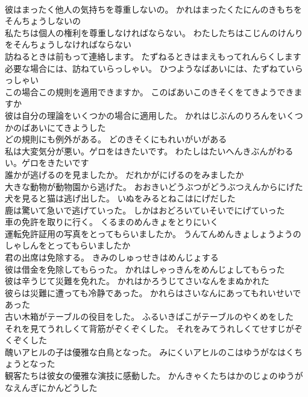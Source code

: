 \documentclass[8pt]{extreport}
\begin{document}
\begin{CJK}{UTF8}{min}
\\	彼はまったく他人の気持ちを尊重しないの。	かれはまったくたにんのきもちをそんちょうしないの 
\\	私たちは個人の権利を尊重しなければならない。	わたしたちはこじんのけんりをそんちょうしなければならない 
\\	訪ねるときは前もって連絡します。	たずねるときはまえもってれんらくします 
\\	必要な場合には、訪ねていらっしゃい。	ひつようなばあいには、たずねていらっしゃい 
\\	この場合この規則を適用できますか。	このばあいこのきそくをてきようできますか 
\\	彼は自分の理論をいくつかの場合に適用した。	かれはじぶんのりろんをいくつかのばあいにてきようした 
\\	どの規則にも例外がある。	どのきそくにもれいがいがある 
\\	私は大変気分が悪い。ゲロをはきたいです。	わたしはたいへんきぶんがわるい。ゲロをきたいです 
\\	誰かが逃げるのを見ましたか。	だれかがにげるのをみましたか 
\\	大きな動物が動物園から逃げた。	おおきいどうぶつがどうぶつえんからにげた 
\\	犬を見ると猫は逃げ出した。	いぬをみるとねこはにげだした 
\\	鹿は驚いて急いで逃げていった。	しかはおどろいていそいでにげていった 
\\	車の免許を取りに行く。	くるまのめんきょをとりにいく 
\\	運転免許証用の写真をとってもらいましたか。	うんてんめんきょしょうようのしゃしんをとってもらいましたか 
\\	君の出席は免除する。	きみのしゅっせきはめんじょする 
\\	彼は借金を免除してもらった。	かれはしゃっきんをめんじょしてもらった 
\\	彼は辛うじて災難を免れた。	かれはかろうじてさいなんをまぬかれた 
\\	彼らは災難に遭っても冷静であった。	かれらはさいなんにあってもれいせいであった 
\\	古い木箱がテーブルの役目をした。	ふるいきばこがテーブルのやくめをした 
\\	それを見てうれしくて背筋がぞくぞくした。	それをみてうれしくてせすじがぞくぞくした 
\\	醜いアヒルの子は優雅な白鳥となった。	みにくいアヒルのこはゆうがなはくちょうとなった 
\\	観客たちは彼女の優雅な演技に感動した。	かんきゃくたちはかのじょのゆうがなえんぎにかんどうした 

\end{CJK}
\end{document}
